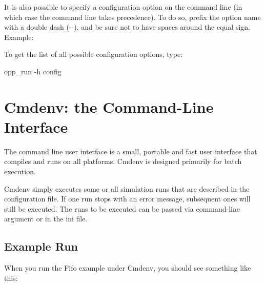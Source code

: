 \begin{note}
  It is also possible to specify a configuration option on the command line (in which case the
  command line takes precedence). To do so, prefix the option name with a double
  dash (-{}-), and be sure not to have spaces around the equal sign. Example:
\end{note}

To get the list of all possible configuration options, type:

\begin{commandline}
opp_run -h config
\end{commandline}


\section{Cmdenv: the Command-Line Interface}

The command line user interface is
a small, portable and fast user interface that compiles and runs on
all platforms. Cmdenv is designed primarily for batch execution.

Cmdenv simply executes some or all simulation runs that are described
in the configuration file. If one run stops with an error message,
subsequent ones will still be executed. The runs to be executed can be
passed via command-line argument or in the ini file.

\subsection{Example Run}

When you run the Fifo example under Cmdenv, you should see
something like this:

